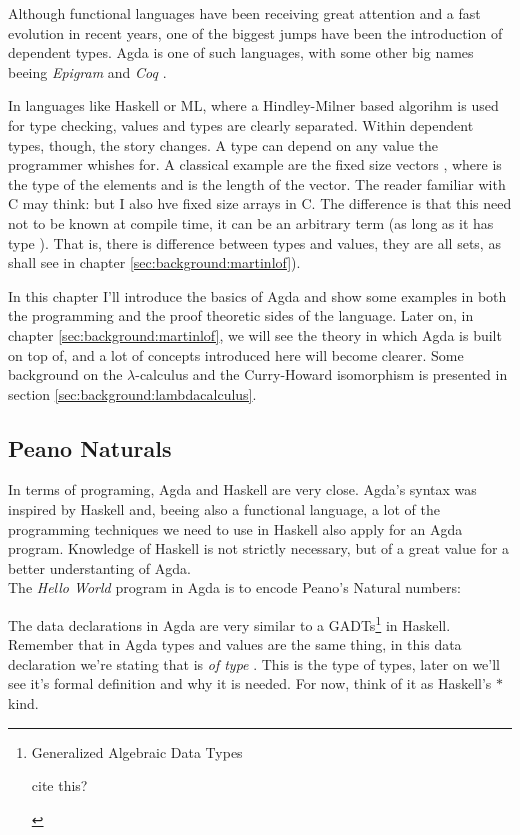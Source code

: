 Although functional languages have been receiving great attention
and a fast evolution in recent years, one of the biggest jumps
have been the introduction of dependent types. Agda\cite{norell07} is one of such languages, with some other 
big names beeing \emph{Epigram} \cite{mcbride05} and \emph{Coq} \cite{bertot06}. 

In languages like Haskell or ML, where a Hindley-Milner based algorihm is used
for type checking, values and types are clearly separated. Within dependent
types, though, the story changes. A type can depend on any value the programmer
whishes for. A classical example are the fixed size vectors , where 
is the type of the elements and  is the length of the vector. The reader familiar
with C may think: but I also hve fixed size arrays in C. The difference is that
this  need not to be known at compile time, it can be an arbitrary term (as long
as it has type ). That is, there is difference between types and values,
they are all sets, as shall see in chapter \ref{sec:background:martinlof}).

In this chapter I'll introduce the basics of Agda and show some examples in both
the programming and the proof theoretic sides of the language. Later on, in 
chapter \ref{sec:background:martinlof}, we will see the theory in which Agda is built 
on top of, and a lot of concepts introduced here will become clearer. 
Some background on the $\lambda$-calculus and the Curry-Howard isomorphism is
presented in section \ref{sec:background:lambdacalculus}.

\subsection{Peano Naturals}

In terms of programing, Agda and Haskell are very close. Agda's syntax was
inspired by Haskell and, beeing also a functional language, a lot of
the programming techniques we need to use in Haskell also apply for an Agda program.
Knowledge of Haskell is not strictly necessary, but of a great value for a better
understanting of Agda.\\

The \emph{Hello World} program in Agda is to encode Peano's Natural numbers:


The data declarations in Agda are very similar to a GADTs\footnote{
Generalized Algebraic Data Types
\begin{TODO}
  \item cite this?
\end{TODO}
} in Haskell. Remember that in Agda types and values are the same thing, 
in this data declaration we're stating that  is \emph{of type} 
. This  is the type of types, later on we'll
see it's formal definition and why it is needed. For now, think of it
as Haskell's $*$ kind.


